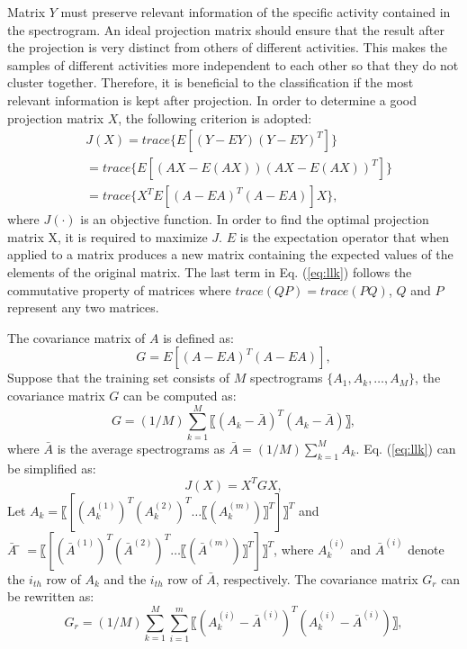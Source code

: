 Matrix $Y$ must preserve relevant information of the specific activity contained in the spectrogram. An ideal projection matrix should ensure that the result after the projection is very distinct from others of different activities. This makes the samples of different activities more independent to each other so that they do not cluster together. Therefore, it is beneficial to the classification if the most relevant information is kept after projection. In order to determine a good projection matrix $X$, the following criterion \cite{zhang20052d} is adopted:
\begin{equation}
\label{eq:llk}
\begin{split}
&J(X)=trace\{E[(Y-EY) (Y-EY)^T ]\} \\&=trace\{E[(AX-E(AX))(AX-E(AX))^T ]\}\\&=trace\{X^T E[(A-EA)^T (A-EA)]X\},
\end{split}
\end{equation}
where $J(\cdot)$ is an objective function. In order to find the optimal projection matrix X, it is required to maximize $J$. $E$ is the expectation operator that when applied to a matrix produces a new matrix containing the expected values of the elements of the original matrix. The last term in Eq. (\ref{eq:llk}) follows the commutative property of matrices where $trace(QP)=trace(PQ)$, $Q$ and $P$ represent any two matrices. 

The covariance matrix \cite{zhang20052d} of $A$ is defined as:
\begin{equation}
G=E[(A-EA)^T (A-EA)], 
\end{equation}
Suppose that the training set consists of $M$ spectrograms $\{A_1,A_k,\ldots,A_M\}$, the covariance matrix  $G$ can be computed as:
\begin{equation}
G=(1/M) \sum_{k=1}^{M}〖(A_k-\bar{A})^T (A_k-\bar{A})〗,
\end{equation}
where $\bar{A}$ is the average spectrograms as $\bar{A}=(1/M) \sum_{k=1}^{M}A_k$.
Eq. (\ref{eq:llk}) can be simplified as:
\begin{equation}
J(X)=X^T GX,
\end{equation}
Let $A_k=〖[(A_k^{(1)} )^T (A_k^{(2)} )^T\ldots〖(A_k^{(m)})〗^T]〗^T$ and $\bar{A} ̅=〖[(\bar{A}^{(1)} )^T (\bar{A}^{(2)} )^T\ldots〖(\bar{A}^{(m)})〗^T]〗^T$, where $A_k^{(i)}$ and $\bar{A}^{(i)}$ denote the $i_{th}$ row of $A_k$ and the $i_{th}$ row of $\bar{A}$, respectively. The covariance matrix  $G_r$ can be rewritten as:
\begin{equation}
G_r=(1/M) \sum_{k=1}^{M}\sum_{i=1}^{m}〖(A_k^{(i)}  -\bar{A}^{(i)} )^T (A_k^{(i)}  -\bar{A}^{(i)})〗,
\end{equation}

